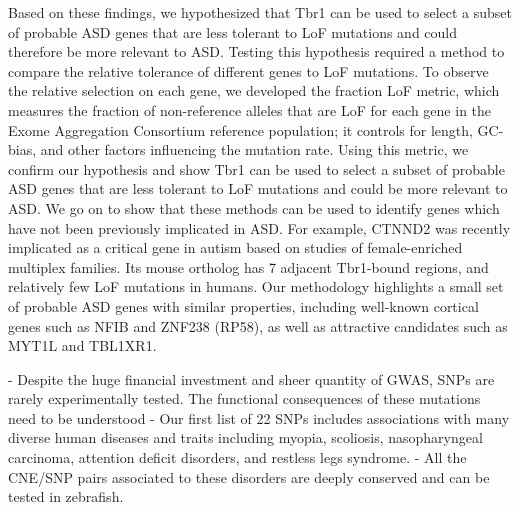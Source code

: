 Based on these findings, we hypothesized that Tbr1 can be used to select a subset of probable ASD genes that are less tolerant to LoF mutations and could therefore be more relevant to ASD. Testing this hypothesis required a method to compare the relative tolerance of different genes to LoF mutations. To observe the relative selection on each gene, we developed the fraction LoF metric, which measures the fraction of non-reference alleles that are LoF for each gene in the Exome Aggregation Consortium reference population; it controls for length, GC-bias, and other factors influencing the mutation rate. Using this metric, we confirm our hypothesis and show Tbr1 can be used to select a subset of probable ASD genes that are less tolerant to LoF mutations and could be more relevant to ASD. We go on to show that these methods can be used to identify genes which have not been previously implicated in ASD. For example, CTNND2 was recently implicated as a critical gene in autism based on studies of female-enriched multiplex families. Its mouse ortholog has 7 adjacent Tbr1-bound regions, and relatively few LoF mutations in humans. Our methodology highlights a small set of probable ASD genes with similar properties, including well-known cortical genes such as NFIB and ZNF238 (RP58), as well as attractive candidates such as MYT1L and TBL1XR1.


  - Despite the huge financial investment and sheer quantity of GWAS, SNPs are rarely experimentally tested. The functional consequences of these mutations need to be understood 
 - Our first list of 22 SNPs includes associations with many diverse human diseases and traits including myopia, scoliosis, nasopharyngeal carcinoma, attention deficit disorders, and restless legs syndrome.
- All the CNE/SNP pairs associated to these disorders are deeply conserved and can be tested in zebrafish.





